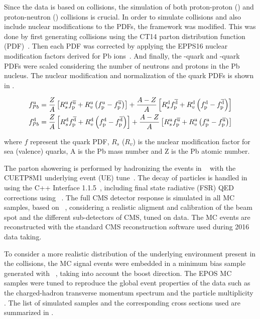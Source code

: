 Since the data is based on \pPb collisions, the simulation of both proton-proton (\pp) and proton-neutron (\pn) collisions is crucial. In order to simulate \pPb collisions and also include nuclear modifications to the PDFs, the \POWHEG framework was modified. This was done by first generating \pp collisions using the CT14 parton distribution function (PDF)~\cite{CT14}. Then each PDF was corrected by applying the EPPS16 nuclear modification factors derived for Pb ions~\cite{EPPS16}. And finally, the \cPqu-quark and \cPqd-quark PDFs were scaled considering the number of neutrons and protons in the Pb nucleus. The nuclear modification and normalization of the quark PDFs is shown in .

\begin{equation}
\begin{aligned}
f^{\text{u}}_{Pb} &= \frac{Z}{A}\left[R^{\text{u}}_{s}f^{\overline{\text{u}}}_{\text{p}} + R^{\text{u}}_{v}\left(f^{\text{u}}_{\text{p}}-f^{\overline{\text{u}}}_{\text{p}}\right)\right] + \frac{A-Z}{A}\left[R^{\text{d}}_{s}f^{\overline{\text{d}}}_{\text{p}} + R^{\text{d}}_{v}\left(f^{\text{d}}_{\text{p}}-f^{\overline{\text{d}}}_{\text{p}}\right)\right] \\
f^{\text{d}}_{Pb} &= \frac{Z}{A}\left[R^{\text{d}}_{s}f^{\overline{\text{d}}}_{\text{p}} + R^{\text{d}}_{v}\left(f^{\text{d}}_{\text{p}}-f^{\overline{\text{d}}}_{\text{p}}\right)\right] + \frac{A-Z}{A}\left[R^{\text{u}}_{s}f^{\overline{\text{u}}}_{\text{p}} + R^{\text{u}}_{v}\left(f^{\text{u}}_{\text{p}}-f^{\overline{\text{u}}}_{\text{p}}\right)\right]
\end{aligned}
\label{eq:PbScaling}
\end{equation}

where $f$ represent the quark PDF, $R_{s}$ ($R_{v}$) is the nuclear modification factor for sea (valence) quarks, A is the Pb mass number and Z is the Pb atomic number.

The parton showering is performed by hadronizing the \POWHEG events in ~\cite{PYTHIA8} with the CUETP8M1 underlying event (UE) tune~\cite{PYTHIA_TUNE,UE_pp}. The decay of \PGt particles is handled in \PYTHIA using the \TAUOLA C++ Interface 1.1.5~\cite{TAUOLA}, including final state radiative (FSR) QED corrections using~ \cite{PHOTOS}. The full CMS detector response is simulated in all MC samples, based on \GEANTfour~\cite{GEANT4}, considering a realistic aligment and calibration of the beam spot and the different sub-detectors of CMS, tuned on data. The MC events are reconstructed with the standard CMS \pp reconstruction software used during 2016 data taking.

To consider a more realistic distribution of the underlying environment present in the \pPb collisions, the MC signal events were embedded in a minimum bias sample generated with \EPOS~\cite{EPOS}, taking into account the \pPb boost direction. The EPOS MC samples were tuned to reproduce the global event properties of the \pPb data such as the charged-hadron transverse momentum spectrum and the particle multiplicity \cite{dNdEta_pPb}. The list of simulated samples and the corresponding cross sections used are summarized in .

